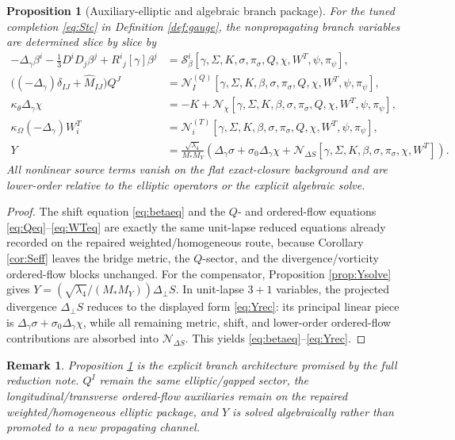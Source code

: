 \documentclass[11pt]{article}
\newtheorem{proposition}{Proposition}
\newtheorem{remark}{Remark}
\begin{document}
\begin{proposition}[Auxiliary-elliptic and algebraic branch package]
\label{prop:auxpackage}
For the tuned completion \eqref{eq:Stc} in Definition \ref{def:gauge}, the nonpropagating branch variables are determined slice by slice by
\begin{align}
-\Delta_\gamma\beta^i
-\frac13 D^iD_j\beta^j
+R^i{}_j[\gamma]\beta^j
&=
\mathcal S_\beta^i[\gamma,\Sigma,K,\sigma,\pi_\sigma,Q,\chi,W^T,\psi,\pi_\psi],
\label{eq:betaeq}
\\
\bigl((-\Delta_\gamma)\delta_{IJ}+\widehat M_{IJ}\bigr)Q^J
&=
\mathcal N_I^{(Q)}[\gamma,\Sigma,K,\beta,\sigma,\pi_\sigma,Q,\chi,W^T,\psi,\pi_\psi],
\label{eq:Qeq}
\\
\kappa_\theta\Delta_\gamma\chi
&=
-K+\mathcal N_\chi[\gamma,\Sigma,K,\beta,\sigma,\pi_\sigma,Q,\chi,W^T,\psi,\pi_\psi],
\label{eq:chieq}
\\
\kappa_\Omega(-\Delta_\gamma)W_i^T
&=
\mathcal N_i^{(T)}[\gamma,\Sigma,K,\beta,\sigma,\pi_\sigma,Q,\chi,W^T,\psi,\pi_\psi],
\label{eq:WTeq}
\\
Y
&=
\frac{\sqrt{\lambda_4}}{M_*M_Y}
\left(
\Delta_\gamma\sigma+\sigma_0\Delta_\gamma\chi+\mathcal N_{\Delta S}[\gamma,\Sigma,K,\beta,\sigma,\pi_\sigma,\chi,W^T]
\right).
\label{eq:Yrec}
\end{align}
All nonlinear source terms vanish on the flat exact-closure background and are lower-order relative to the elliptic operators or the explicit algebraic solve.
\end{proposition}

\begin{proof}
The shift equation \eqref{eq:betaeq} and the \(Q\)- and ordered-flow equations \eqref{eq:Qeq}--\eqref{eq:WTeq} are exactly the same unit-lapse reduced equations already recorded on the repaired weighted/homogeneous route, because Corollary \ref{cor:Seff} leaves the bridge metric, the \(Q\)-sector, and the divergence/vorticity ordered-flow blocks unchanged. For the compensator, Proposition \ref{prop:Ysolve} gives \(Y=(\sqrt{\lambda_4}/(M_*M_Y))\Delta_\perp S\). In unit-lapse \(3+1\) variables, the projected divergence \(\Delta_\perp S\) reduces to the displayed form \eqref{eq:Yrec}: its principal linear piece is \(\Delta_\gamma\sigma+\sigma_0\Delta_\gamma\chi\), while all remaining metric, shift, and lower-order ordered-flow contributions are absorbed into \(\mathcal N_{\Delta S}\). This yields \eqref{eq:betaeq}--\eqref{eq:Yrec}.
\end{proof}

\begin{remark}
Proposition \ref{prop:auxpackage} is the explicit branch architecture promised by the full reduction note. \(Q^I\) remain the same elliptic/gapped sector, the longitudinal/transverse ordered-flow auxiliaries remain on the repaired weighted/homogeneous elliptic package, and \(Y\) is solved algebraically rather than promoted to a new propagating channel.
\end{remark}
\end{document}
